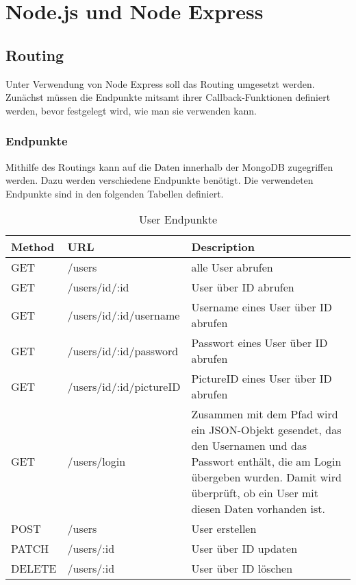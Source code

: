 \chapter{Node.js und Node Express}

\section{Routing}
Unter Verwendung von Node Express soll das Routing umgesetzt werden. Zunächst müssen die Endpunkte mitsamt ihrer Callback-Funktionen definiert werden, bevor festgelegt wird, wie man sie verwenden kann.

\subsection{Endpunkte}

Mithilfe des Routings kann auf die Daten innerhalb der MongoDB zugegriffen werden. Dazu werden verschiedene Endpunkte benötigt. Die verwendeten Endpunkte sind in den folgenden Tabellen definiert.

\begin{table}[!htb]
\begin{tabularx}{\textwidth}{|X|X|X|}
    \hline
    \textbf{Method} & \textbf{URL} & \textbf{Description} \\
    \hline
    \hline
    GET & /users & alle User abrufen\\
    \hline
    GET & /users/id/:id & User über ID abrufen\\
    \hline
    GET & /users/id/:id/username & Username eines User über ID abrufen\\
    \hline 
    GET & /users/id/:id/password & Passwort eines User über ID abrufen\\
    \hline
    GET & /users/id/:id/pictureID & PictureID eines User über ID abrufen\\
    \hline
    GET & /users/login & Zusammen mit dem Pfad wird ein JSON-Objekt gesendet, das den Usernamen und das Passwort enthält, die am Login übergeben wurden. Damit wird überprüft, ob ein User mit diesen Daten vorhanden ist.\\
    \hline
    POST & /users & User erstellen\\
    \hline
    PATCH & /users/:id & User über ID updaten\\
    \hline
    DELETE & /users/:id & User über ID löschen\\
    \hline
\end{tabularx}
\caption{User Endpunkte}
\label{endpunkte}
\end{table}

